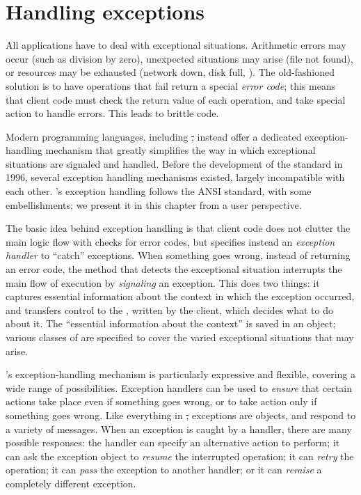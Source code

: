 \documentclass[a4paper,10pt,twoside]{book}
\begin{document}
	\renewcommand{\nnbb}[2]{} %
	\sloppy
\fi

\chapter{Handling exceptions}


All applications have to deal with exceptional situations.
Arithmetic errors may occur (such as division by zero), unexpected situations may arise (file not found), or resources may be exhausted (network down, disk full, \etc).
The old-fashioned solution is to have operations that fail return a special \emph{error code}; this means that client code must check the return value of each operation, and take special action to handle errors. This leads to brittle code. 

Modern programming languages, including \st, instead offer a dedicated exception-handling mechanism that greatly simplifies the way in which exceptional situations are signaled and handled.
Before the development of the  standard in 1996, several  exception handling mechanisms existed, largely incompatible with each other. \pharo's exception handling follows the ANSI standard, with some embellishments; we present it in this chapter from a user perspective.

The basic idea behind exception handling is that 
client code does not clutter the main logic flow with checks for error codes, but specifies instead an \emph{exception handler} to ``catch'' exceptions.
When something goes wrong, instead of returning an error code, the method that detects the exceptional situation interrupts the main flow of execution by  \emph{signaling} an exception.
This does two things: it captures essential information about the context in which the exception occurred, and transfers control to the , written by the client, which decides what to do about it.
The ``essential information about the context'' is saved in an  object; 
various classes of  are specified to cover the varied exceptional situations that may arise.

\pharo's exception-handling mechanism is particularly expressive and flexible, covering a wide range of possibilities. Exception handlers can be used to \emph{ensure} that certain actions take place even if something goes wrong, or to take action only if something goes wrong.
Like everything in \st, exceptions are objects, and respond to a variety of messages.
When an exception is caught by a handler, there are many possible responses: the  handler can specify an alternative action to perform; it can ask the exception object to \emph{resume} the interrupted operation; it can \emph{retry} the operation; it can \emph{pass} the exception to another handler; or it can \emph{reraise} a completely different exception.
\end{document}
